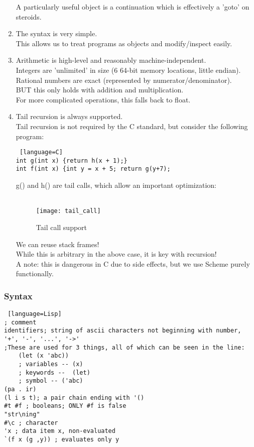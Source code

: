 \documentclass[../../lecture_notes.tex]{subfiles}
\begin{document}
\begin{enumerate}
		A particularly useful object is a continuation which is effectively a 'goto' on steroids.
	\item The syntax is very simple.\\
		This allows us to treat programs as objects and modify/inspect easily.
	\item Arithmetic is high-level and reasonably machine-independent.\\
		Integers are 'unlimited' in size (6 64-bit memory locations, little endian).\\
		Rational numbers are exact (represented by numerator/denominator).\\
		BUT this only holds with addition and multiplication.\\
		For more complicated operations, this falls back to float.\\
	\item Tail recursion is always supported.\\
		Tail recursion is not required by the C standard, but consider the following program:\\
		\begin{lstlisting} [language=C]
int g(int x) {return h(x + 1);}
int f(int x) {int y = x + 5; return g(y+7);
		\end{lstlisting}
		g() and h() are tail calls, which allow an important optimization:\\\

		\begin{figure}[H]
			\centering
			\texttt{[image: tail\_call]}
			\caption{Tail call support}
			\label{fig:test}
		\end{figure}
		
		We can reuse stack frames!\\
		While this is arbitrary in the above case, it is key with recursion!\\
		A note: this is dangerous in C due to side effects, but we use Scheme purely functionally.
\end{enumerate}

\subsubsection*{Syntax}
\begin{lstlisting} [language=Lisp]
; comment
identifiers; string of ascii characters not beginning with number, '+', '-', '...', '->'
;These are used for 3 things, all of which can be seen in the line:
	(let (x 'abc))
	; variables -- (x)
	; keywords --  (let)
	; symbol -- ('abc)
(pa . ir)
(l i s t); a pair chain ending with '() 
#t #f ; booleans; ONLY #f is false
"str\ning"
#\c ; character
'x ; data item x, non-evaluated
`(f x (g ,y)) ; evaluates only y
\end{lstlisting}
\end{document}
